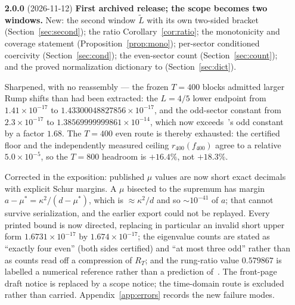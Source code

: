 \documentclass[11pt,a4paper]{article}
\theoremstyle{definition}
\theoremstyle{remark}
\begin{document}
\begin{itemize}
{  improves past the withdrawn one.} Rather than repair the unbounded quadrature
  remainder, the endpoint is tightened along the route that has no quadrature to
  bound: the closed-form evaluation is pushed from $28$ even cosine modes to
  $160$, giving $U = 1.6731255341\times10^{-17}$ in place of
  $2.1130\times10^{-17}$, and in place of the withdrawn time-domain value
  $1.9014\times10^{-17}$ as well. The bracket narrows to $2.64\times10^{-18}$,
  $80.9\%$ inside the published one, and the parity margin grows to
  $6.27\times10^{-18}$. The lower bound, the odd-sector bound, the $R_T$ values
  and the ceilings are unchanged. The outer quadrature remainder of
  Section~\ref{sec:status} remains open; it is no longer on the critical path.
\item[\textbf{2.0.0}] (2026-11-12) \textbf{First archived release; the scope
  becomes two windows.} New: the second window $\widetilde L$ with its own
  two-sided bracket (Section~\ref{sec:second}); the ratio
  Corollary~\ref{cor:ratio}; the monotonicity and coverage statement
  (Proposition~\ref{prop:mono}); per-sector conditioned coercivity
  (Section~\ref{sec:cond}); the even-sector count
  (Section~\ref{sec:count}); and the proved normalization dictionary to
  \cite{ACLG} (Section~\ref{sec:dict}).

  Sharpened, with no reassembly --- the frozen $T = 400$ blocks admitted larger
  Rump shifts than had been extracted: the $L = 4/5$ lower endpoint from
  $1.41\times10^{-17}$ to $1.43300048827856\times10^{-17}$, and the odd-sector
  constant from $2.3\times10^{-17}$ to $1.38569999999861\times10^{-14}$, which
  now exceeds~\cite[Thm.~6.2]{Zhu}'s odd constant by a factor $1.68$. The
  $T = 400$ even route is thereby exhausted: the certified floor and the
  independently measured ceiling $r_{400}(f_{400})$ agree to a relative
  $5.0\times10^{-5}$, so the $T = 800$ headroom is $+16.4\%$, not $+18.3\%$.

  Corrected in the exposition: published $\mu$ values are now short exact
  decimals with explicit Schur margins. A $\mu$ bisected to the supremum has
  margin $a - \mu^\ast = \kappa^2/(d-\mu^\ast)$, which is $\approx \kappa^2/d$
  and so $\sim10^{-41}$ of $a$; that cannot survive serialization, and the
  earlier export could not be replayed. Every printed
  bound is now directed, replacing in particular an invalid short upper form
  $1.6731\times10^{-17}$ by $1.674\times10^{-17}$; the eigenvalue counts are
  stated as ``exactly four even'' (both sides certified) and ``at most three
  odd'' rather than as counts read off a compression of $R_T$; and the
  rung-ratio value $0.579867$ is labelled a numerical reference rather than a
  prediction of~\cite[Hyp.~3.4]{ACLG}. The front-page draft notice is replaced
  by a scope notice; the time-domain route is excluded rather than carried.
  Appendix~\ref{app:errors} records the new failure modes.
\end{itemize}
\end{document}
